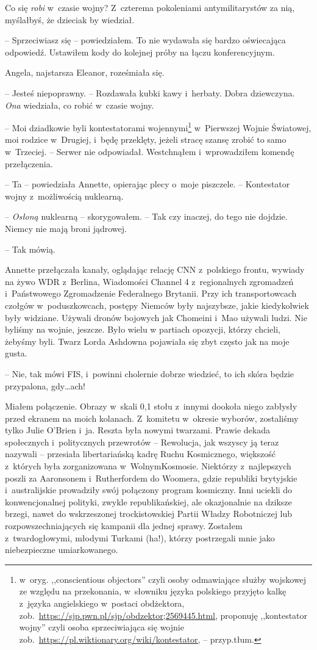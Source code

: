 \documentclass[oneside,polish,11pt,sfheadings]{mwbk}
\begin{document}
Co się \emph{robi} w~czasie wojny? Z~czterema pokoleniami
antymilitarystów za nią, myślałbyś, że dzieciak by wiedział.

-- Sprzeciwiasz się -- powiedziałem. To nie wydawała się bardzo oświecająca
odpowiedź. Ustawiłem kody do kolejnej próby na łączu konferencyjnym.

Angela, najstarsza Eleanor, roześmiała się. 

-- Jesteś niepoprawny. -- Rozdawała kubki kawy i~herbaty. Dobra dziewczyna. \emph{Ona} wiedziała,
co robić w~czasie wojny.

-- Moi dziadkowie byli kontestatorami wojennymi\footnote{w~oryg.
,,conscientious objectors'' czyli osoby odmawiające służby wojskowej ze względu na
przekonania, w~słowniku języka polskiego przyjęto kalkę z~języka
angielskiego w~postaci obdżektora,
zob.~\url{https://sjp.pwn.pl/sjp/obdzektor;2569445.html},
proponuję ,,kontestator wojny'' czyli osoba sprzeciwiająca się wojnie
zob.~\url{https://pl.wiktionary.org/wiki/kontestator,} -- przyp.tłum. } w~Pierwszej Wojnie Światowej, moi rodzice w~Drugiej, i~będę przeklęty, jeżeli stracę szansę zrobić to samo w~Trzeciej. -- Serwer
nie odpowiadał. Westchnąłem i~wprowadziłem komendę przełączenia.

-- Ta -- powiedziała Annette, opierając plecy o~moje piszczele. -- Kontestator wojny z~możliwością nuklearną.

-- \emph{Osłoną} nuklearną -- skorygowałem. -- Tak czy inaczej, do tego nie
dojdzie. Niemcy nie mają broni jądrowej.

-- Tak mówią.

Annette przełączała kanały, oglądając relację CNN z~polskiego frontu,
wywiady na żywo WDR z~Berlina, Wiadomości Channel 4 z~regionalnych
zgromadzeń i~Państwowego Zgromadzenie Federalnego Brytanii. Przy ich
transportowcach czołgów w~poduszkowcach, postępy Niemców były
najszybsze, jakie kiedykolwiek były widziane. Używali dronów bojowych jak
Chomeini i~Mao używali ludzi. Nie byliśmy na wojnie, jeszcze. Było wielu
w partiach opozycji, którzy chcieli, żebyśmy byli. Twarz Lorda Ashdowna
pojawiała się zbyt często jak na moje gusta.

-- Nie, tak mówi FIS, i~powinni cholernie dobrze wiedzieć, to ich skóra
będzie przypalona, gdy\ldots ach!

Miałem połączenie. Obrazy w~skali 0,1 stołu z~innymi dookoła niego
zabłysły przed ekranem na moich kolanach. Z~komitetu w~okresie wyborów,
zostaliśmy tylko Julie O'Brien i~ja. Reszta była nowymi twarzami. Prawie
dekada społecznych i~politycznych przewrotów -- Rewolucja, jak wszyscy ją
teraz nazywali -- przesiała libertariańską kadrę Ruchu Kosmicznego,
większość z~których była zorganizowana w~WolnymKosmosie. Niektórzy z~najlepszych poszli za Aaronsonem i~Rutherfordem do Woomera, gdzie
republiki brytyjskie i~australijskie prowadziły swój połączony program
kosmiczny. Inni uciekli do konwencjonalnej polityki, zwykle
republikańskiej, ale okazjonalnie na dziksze brzegi, nawet do
wskrzeszonej trockistowskiej Partii Władzy Robotniczej lub
rozpowszechniających się kampanii dla jednej sprawy. Zostałem z~twardogłowymi, młodymi Turkami (ha!), którzy postrzegali mnie jako
niebezpieczne umiarkowanego.
\end{document}
